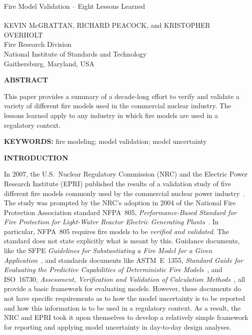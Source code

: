 \documentclass[fleqn,b5paper]{article}
\begin{document}
\renewcommand{\thefootnote}{\sf \arabic{footnote}}
\renewcommand{\d}{\mathrm{d}}
\renewcommand{\labelitemi}{{\scriptsize $\bullet$}}
\renewcommand{\labelitemii}{{\scriptsize $\bullet$}}




\begin{flushleft}
{\helvb Fire Model Validation -- Eight Lessons Learned}\\
\hspace{1in}\\
\helvn KEVIN McGRATTAN\footnotemark[1], RICHARD PEACOCK\footnotemark[1], and KRISTOPHER OVERHOLT\footnotemark[1]  \\
\footnotemark[1] Fire Research Division \\
National Institute of Standards and Technology \\
Gaithersburg, Maryland, USA
\end{flushleft}
\rm

\vspace{\parskip}
{\bf ABSTRACT}

This paper provides a summary of a decade-long effort to verify and validate a variety of different fire models used in the commercial nuclear industry. The lessons learned apply to any industry in which fire models are used in a regulatory context. 

\vspace{\parskip}
{\bf KEYWORDS:} fire modeling; model validation; model uncertainty

\vspace{\parskip}
{\bf INTRODUCTION}

In 2007, the U.S.~Nuclear Regulatory Commission (NRC) and the Electric Power Research Institute (EPRI) published the results of a validation study of five different fire models commonly used by the commercial nuclear power industry~\cite{NUREG_1824}. The study was prompted by the NRC's adoption in 2004 of the National Fire Protection Association standard NFPA~805, {\em Performance-Based Standard for Fire Protection for Light-Water Reactor Electric Generating Plants}~\cite{NFPA_805}. In particular, NFPA~805 requires fire models to be {\em verified and validated}. The standard does not state explicitly what is meant by this. Guidance documents, like the SFPE {\em Guidelines for Substantiating a Fire Model for a Given Application}~\cite{SFPE_G.06}, and standards documents like ASTM~E~1355, {\em Standard Guide for Evaluating the Predictive Capabilities of Deterministic Fire Models}~\cite{ASTM:E1355}, and ISO~16730, {\em Assessment, Verification and Validation of Calculation Methods}~\cite{ISO16730}, all provide a basic framework for evaluating models. However, these documents do not have specific requirements as to how the model uncertainty is to be reported and how this information is to be used in a regulatory context. As a result, the NRC and EPRI took it upon themselves to develop a relatively simple framework for reporting and applying model uncertainty in day-to-day design analyses.
\end{document}
